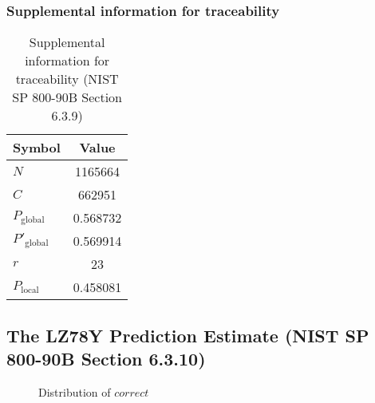 \documentclass[a3paper,xelatex,english]{bxjsarticle}
\begin{document}
\subsubsection{Supplemental information for traceability}
\renewcommand{\arraystretch}{1.8}
\begin{table}[h]
\caption{Supplemental information for traceability (NIST SP 800-90B Section 6.3.9)}
\begin{center}
\begin{tabular}{|l|c|}
\hline 
\rowcolor{anotherlightblue} %
Symbol				& Value \\ \hline 
$N$				& 1165664\\ \hline 
$C$				& 662951\\ \hline 
$P_{\textrm{global}}$				& 0.568732\\ \hline 
$P'_{\textrm{global}}$			& 0.569914\\ \hline 
$r$				& 23\\ \hline 
$P_{\textrm{local}}$ 			& 0.458081\\ \hline
\end{tabular}
\end{center}
\end{table}
\renewcommand{\arraystretch}{1.4}
\clearpage
\subsection{The LZ78Y Prediction Estimate (NIST SP 800-90B Section 6.3.10)}\label{sec:Binary6310}

\begin{figure}[htbp]
\centering

\caption{Distribution of $correct$}
\end{figure}
\end{document}
